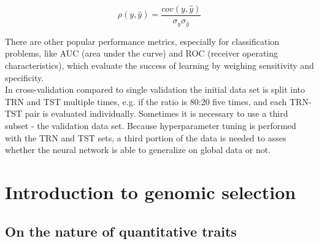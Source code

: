 \begin{equation}
  \rho(y,\hat{y}) = \frac{cov(y,\hat{y})}{ \sigma_y \sigma_{\hat{y}}}
 \label{eqn:pearson}
\end{equation}

There are other popular performance metrics, especially for classification problems, like
AUC (area under the curve) and ROC (receiver operating characteristics), which evaluate
the success of learning by weighing sensitivity and specificity. \\
In cross-validation compared to single validation the initial data set is split into TRN
and TST multiple times, e.g. if the ratio is 80:20 five times, and each TRN-TST pair is
evaluated individually. Sometimes it is necessary to use a third subset - the validation
data set. Because hyperparameter tuning is performed with the TRN and TST sets, a third
portion of the data is needed to asses whether the neural network is able to generalize on
global data or not.

 

\newpage
\section{Introduction to genomic selection}
\subsection{On the nature of quantitative traits} \label{quan}

